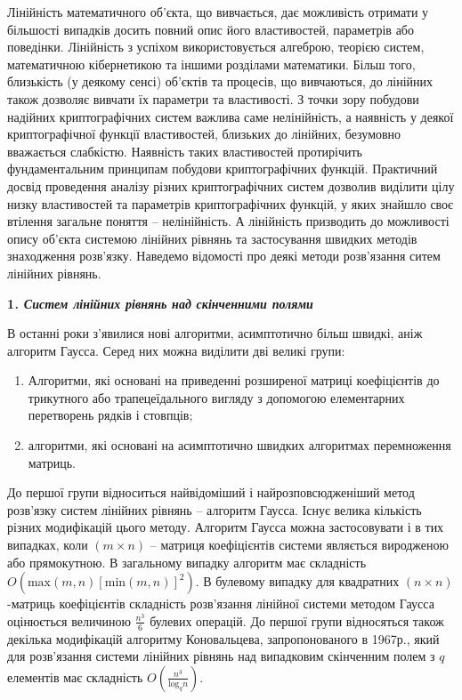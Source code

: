 \documentclass[a4paper]{article}
\newcommand\liststyleWWviiiNumxxiii{%
\renewcommand\theenumi{\arabic{enumi}}
\renewcommand\theenumii{\alph{enumii}}
\renewcommand\theenumiii{\roman{enumiii}}
\renewcommand\theenumiv{\arabic{enumiv}}
\renewcommand\labelenumi{\theenumi.}
\renewcommand\labelenumii{\theenumii.}
\renewcommand\labelenumiii{\theenumiii.}
\renewcommand\labelenumiv{\theenumiv.}
}
\newcounter{}
\begin{document}
\bigskip


\bigskip

Лінійність математичного об’єкта, що вивчається, дає можливість отримати у
більшості випадків досить повний опис його властивостей, параметрів або
поведінки. Лінійність з успіхом використовується алгеброю, теорією систем,
математичною кібернетикою та іншими розділами математики. Більш того,
близькість (у деякому сенсі)  об’єктів та процесів, що вивчаються, до лінійних
також дозволяє вивчати їх параметри та властивості. З точки зору побудови
надійних криптографічних систем важлива саме нелінійність, а наявність у деякої
криптографічної функції властивостей, близьких до лінійних, безумовно
вважається слабкістю. Наявність таких властивостей протирічить фундаментальним
принципам побудови криптографічних функцій. Практичний досвід проведення
аналізу різних криптографічних систем дозволив виділити цілу низку властивостей
та параметрів криптографічних функцій, у яких знайшло своє втілення загальне
поняття – нелінійність. А лінійність призводить до можливості опису об’єкта
системою лінійних рівнянь та застосування швидких методів знаходження
розв’язку. Наведемо відомості про деякі методи розв’язання ситем лінійних
рівнянь.


\bigskip

{\bfseries
1\textit{. Систем лінійних рівнянь над скінченними полями}}

 В останні роки з’явилися нові алгоритми, асимптотично більш швидкі, аніж
алгоритм Гаусса. Серед них можна виділити дві великі групи:

\liststyleWWviiiNumxxiii
\begin{enumerate}
\item Алгоритми, які основані на приведенні розширеної матриці коефіцієнтів до
трикутного або трапецеїдального вигляду з допомогою елементарних перетворень
рядків і стовпців;
\item алгоритми, які основані на асимптотично швидких алгоритмах перемноження
матриць.
\end{enumerate}
До першої групи відноситься найвідоміший і найрозповсюдженіший метод розв’язку
систем лінійних рівнянь – алгоритм Гаусса. Існує велика кількість різних
модифікацій цього методу. Алгоритм Гаусса можна застосовувати і в тих випадках,
коли  ${(m\times n)}$ – матриця коефіцієнтів системи являється виродженою або
прямокутною. В загальному випадку алгоритм має складність 
${O(\text{max}(m,n)[\text{min}(m,n)]^{{2}})}$. В булевому випадку для
квадратних  ${(n\times n)}${}-матриць коефіцієнтів складність розв’язання
лінійної системи методом Гаусса оцінюється величиною  ${\frac{n^{{3}}}{6}}$
булевих операцій. До першої групи відносяться також декілька модифікацій
алгоритму Коновальцева, запропонованого в 1967р., який для розв’язання системи
лінійних рівнянь над випадковим скінченним полем з  ${q}$ елементів має
складність  ${O\left(\frac{n^{{3}}}{\text{log}_{{q}}n}\right)}$.
\end{document}
